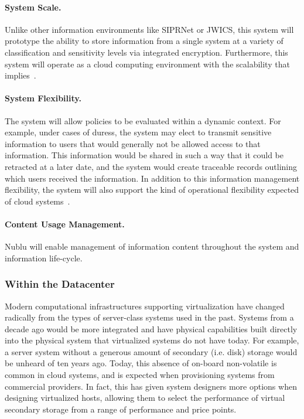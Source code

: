 \documentclass[10pt,letterpaper]{article}
\begin{document}
\paragraph{System Scale.} Unlike other information environments like SIPRNet or JWICS, this system will prototype the ability to store information from a single system at a variety of classification and sensitivity levels via integrated encryption.  Furthermore, this system will operate as a cloud computing environment with the scalability that implies~.

\paragraph{System Flexibility.} The system will allow policies to be evaluated within a dynamic context.  For example, under cases of duress, the system may elect to transmit sensitive information to users that would generally not be allowed access to that information.  This information would be shared in such a way that it could be retracted at a later date, and the system would create traceable records outlining which users received the information.  In addition to this information management flexibility, the system will also support the kind of operational flexibility expected of cloud systems~.

\paragraph{Content Usage Management.} Nublu will enable management of information content throughout the system and information life-cycle.

\subsubsection{Within the Datacenter}
Modern computational infrastructures supporting virtualization have changed radically from the types of server-class systems used in the past.  Systems from a decade ago would be more integrated and have physical capabilities built directly into the physical system that virtualized systems do not have today. For example, a server system without a generous amount of secondary (i.e. disk) storage would be unheard of ten years ago.  Today, this absence of on-board non-volatile is common in cloud systems, and is expected when provisioning systems from commercial providers.  In fact, this has given system designers more options when designing virtualized hosts, allowing them to select the performance of virtual secondary storage from a range of performance and price points.
\end{document}
